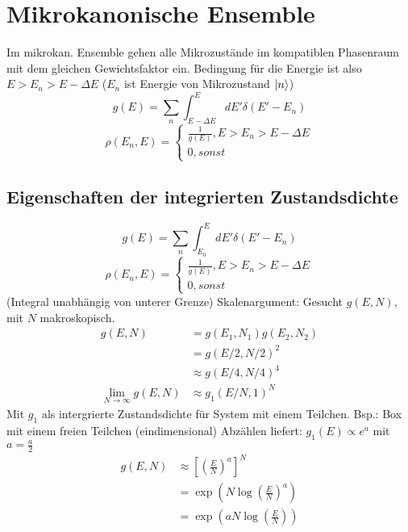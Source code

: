 \chapter{Mikrokanonische Ensemble}

Im mikrokan. Ensemble gehen alle Mikrozustände im kompatiblen Phasenraum mit dem gleichen Gewichtsfaktor ein.
Bedingung für die Energie ist also $E > E_n > E - \Delta E$ ($E_n$ ist Energie von Mikrozustand $\ket n$)
\begin{equation*}
g(E) = \sum_n{}\int_{E-\Delta E}^{E}dE'\delta (E' - E_n)
\end{equation*}
\begin{equation*}
\rho(E_n, E) = \begin{cases}\frac{1}{g(E)} , E>E_n>E-\Delta E\\0 , sonst\end{cases}
\end{equation*}

\section{Eigenschaften der integrierten Zustandsdichte}
\begin{equation*}
g(E) = \sum_n{}\int_{E_0}^{E}dE'\delta (E' - E_n)
\end{equation*}
\begin{equation*}
\rho(E_n, E) = \begin{cases}\frac{1}{g(E)} , E>E_n>E-\Delta E\\0 , sonst\end{cases}
\end{equation*}
(Integral unabhängig von unterer Grenze)
Skalenargument: Gesucht $g(E, N)$, mit $N$ makroskopisch.
\begin{align*}
    g(E, N) &= g(E_1, N_1)g(E_2, N_2)\\
        &= g(E/2, N/2)^2\\
        &\approx g(E/4, N/4)^4\\
    \lim_{N\to\infty}g(E, N) &\approx g_1(E/N, 1)^N
\end{align*}
Mit $g_1$ als intergrierte Zustandsdichte für System mit einem Teilchen.
Bsp.: Box mit einem freien Teilchen (eindimensional)
Abzählen liefert: $g_1(E) \propto e^a$ mit $a = \frac a2$
\begin{align*}
    g(E, N) &\approx [(\frac EN)^a]^N\\
        &= \exp (N\log(\frac EN)^a)\\
        &= \exp (aN\log(\frac EN))
\end{align*}
